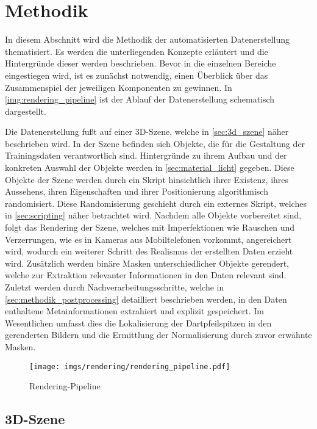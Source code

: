 
\section{Methodik}
\label{sec:daten:methodik}

In diesem Abschnitt wird die Methodik der automatisierten Datenerstellung thematisiert. Es werden die unterliegenden Konzepte erläutert und die Hintergründe dieser werden beschrieben. Bevor in die einzelnen Bereiche eingestiegen wird, ist es zunächst notwendig, einen Überblick über das Zusammenspiel der jeweiligen Komponenten zu gewinnen. In \autoref{img:rendering_pipeline} ist der Ablauf der Datenerstellung schematisch dargestellt.

Die Datenerstellung fußt auf einer 3D-Szene, welche in \autoref{sec:3d_szene} näher beschrieben wird. In der Szene befinden sich Objekte, die für die Gestaltung der Trainingsdaten verantwortlich sind. Hintergründe zu ihrem Aufbau und der konkreten Auswahl der Objekte werden in \autoref{sec:material_licht} gegeben. Diese Objekte der Szene werden durch ein Skript hinsichtlich ihrer Existenz, ihres Aussehens, ihren Eigenschaften und ihrer Positionierung algorithmisch randomisiert. Diese Randomisierung geschieht durch ein externes Skript, welches in \autoref{sec:scripting} näher betrachtet wird. Nachdem alle Objekte vorbereitet sind, folgt das Rendering der Szene, welches mit Imperfektionen wie Rauschen und Verzerrungen, wie es in Kameras aus Mobiltelefonen vorkommt, angereichert wird, wodurch ein weiterer Schritt des Realismus der erstellten Daten erzieht wird. Zusätzlich werden binäre Masken unterschiedlicher Objekte gerendert, welche zur Extraktion relevanter Informationen in den Daten relevant sind. Zuletzt werden durch Nachverarbeitungsschritte, welche in \autoref{sec:methodik_postprocessing} detailliert beschrieben werden, in den Daten enthaltene Metainformationen extrahiert und explizit gespeichert. Im Wesentlichen umfasst dies die Lokalisierung der Dartpfeilspitzen in den gerenderten Bildern und die Ermittlung der Normalisierung durch zuvor erwähnte Masken.

\begin{figure}
    \centering
    \texttt{[image: imgs/rendering/rendering\_pipeline.pdf]}
    \caption{Rendering-Pipeline}
    \label{img:rendering_pipeline}
\end{figure}

\subsection{3D-Szene} %
\label{sec:3d_szene}

